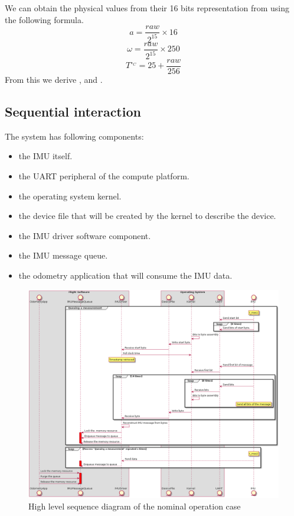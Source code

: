 We can obtain the physical values from their 16 bits representation from using the following formula.
\begin{equation}
    a = \frac{raw}{2^{15}} \times 16
\end{equation}
\begin{equation}
    \omega = \frac{raw}{2^{15}} \times 250
\end{equation}
\begin{equation}
    T^{\circ_C} = 25+\frac{raw}{256}
\end{equation}
From this we derive ,  and .




\subsection{Sequential interaction}
The system has following components:
\begin{itemize}
    \item the IMU itself.
    \item the UART peripheral of the compute platform.
    \item the operating system kernel.
    \item the device file that will be created by the kernel to describe the device.
    \item the IMU driver software component.
    \item the IMU message queue.
    \item the odometry application that will consume the IMU data.
\end{itemize}

\begin{figure}[H]
    \centering
    \includegraphics[width=1.0 \textwidth]{diagrams/high_level_sys_overview.png}
    \caption{High level sequence diagram of the nominal operation case}
    \label{fig-high-level-nominal}
\end{figure}

